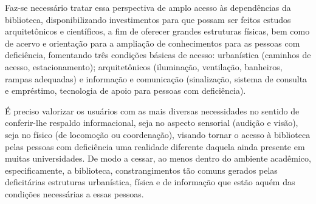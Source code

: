 


	Faz-se necessário tratar essa perspectiva de amplo acesso às dependências da biblioteca, disponibilizando investimentos para que possam ser feitos estudos arquitetônicos e científicos, a fim de oferecer grandes estruturas físicas, bem como de acervo e orientação para a ampliação de conhecimentos para as pessoas com deficiência, fomentando três condições básicas de acesso: urbanística (caminhos de acesso, estacionamento); arquitetônicos (iluminação, ventilação, banheiros, rampas adequadas) e informação e comunicação (sinalização, sistema de consulta e empréstimo, tecnologia de apoio para pessoas com deficiência).
	
	É preciso valorizar os usuários com as mais diversas necessidades no sentido de conferir-lhe respaldo informacional, seja no aspecto sensorial (audição e visão), seja no físico (de locomoção ou coordenação), visando tornar o acesso à biblioteca pelas pessoas com deficiência uma realidade diferente daquela ainda presente em muitas universidades. De modo a cessar, ao menos dentro do ambiente acadêmico, especificamente, a biblioteca, constrangimentos tão comuns gerados pelas deficitárias estruturas urbanística, física e de informação que estão aquém das condições necessárias a essas pessoas.
	


